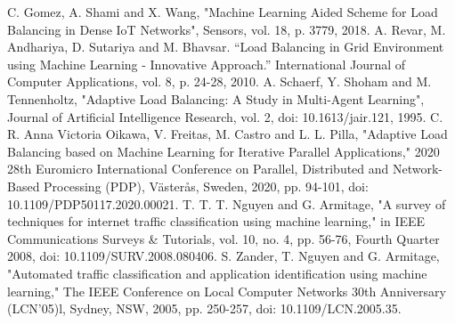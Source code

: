 \documentclass[conference]{IEEEtran}
\begin{document}
\begin{thebibliography}{1}
C. Gomez, A. Shami and X. Wang, "Machine Learning Aided Scheme for Load Balancing in Dense IoT Networks", Sensors, vol. 18, p. 3779, 2018.
A. Revar, M. Andhariya, D. Sutariya and M. Bhavsar. “Load Balancing in Grid Environment using Machine Learning - Innovative Approach.” International Journal of Computer Applications, vol. 8, p. 24-28, 2010.
A. Schaerf, Y. Shoham and M. Tennenholtz, "Adaptive Load Balancing: A Study in Multi-Agent Learning", Journal of Artificial Intelligence Research, vol. 2, doi: 10.1613/jair.121, 1995. 
C. R. Anna Victoria Oikawa, V. Freitas, M. Castro and L. L. Pilla, "Adaptive Load Balancing based on Machine Learning for Iterative Parallel Applications," 2020 28th Euromicro International Conference on Parallel, Distributed and Network-Based Processing (PDP), Västerås, Sweden, 2020, pp. 94-101, doi: 10.1109/PDP50117.2020.00021.
T. T. T. Nguyen and G. Armitage, "A survey of techniques for internet traffic classification using machine learning," in IEEE Communications Surveys \& Tutorials, vol. 10, no. 4, pp. 56-76, Fourth Quarter 2008, doi: 10.1109/SURV.2008.080406.
S. Zander, T. Nguyen and G. Armitage, "Automated traffic classification and application identification using machine learning," The IEEE Conference on Local Computer Networks 30th Anniversary (LCN'05)l, Sydney, NSW, 2005, pp. 250-257, doi: 10.1109/LCN.2005.35.

\end{thebibliography}




\end{document}
